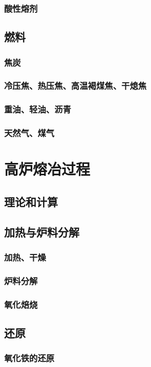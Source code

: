 \documentclass[UTF8]{../../ApplicationUniverse}
\begin{document}
        \subsubsection{酸性熔剂}
    \subsection{燃料}
        \subsubsection{焦炭}
        \subsubsection{冷压焦、热压焦、高温褐煤焦、干熄焦}
        \subsubsection{重油、轻油、沥青}
        \subsubsection{天然气、煤气}
\section{高炉熔冶过程}
    \subsection{理论和计算}
    \subsection{加热与炉料分解}
        \subsubsection{加热、干燥}
        \subsubsection{炉料分解}
        \subsubsection{氧化焙烧}
    \subsection{还原}
        \subsubsection{氧化铁的还原}
\end{document}
